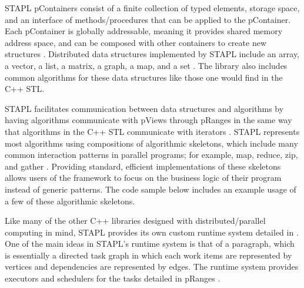 {STAPL pContainers consist of a finite collection of typed elements, storage space, and an interface of methods/procedures that can be applied to the pContainer. \cite{stapl_parallel_container} Each pContainer is globally addressable, meaning it provides shared memory address space, and can be composed with other containers to create new structures \cite{stapl_parallel_container}. Distributed data structures implemented by STAPL include an array, a vector, a list, a matrix, a graph, a map, and a set \cite{stapl_parray} \cite{stapl_graph}. The library also includes common algorithms for these data structures like those one would find in the C++ STL. 

STAPL facilitates communication between data structures and algorithms by having algorithms communicate with pViews through pRanges in the same way that algorithms in the C++ STL communicate with iterators \cite{stapl_parallel_container}. STAPL represents most algorithms using compositions of algorithmic skeletons, which include many common interaction patterns in parallel programs; for example, map, reduce, zip, and gather \cite{stapl_skeleton_framework}. Providing standard, efficient implementations of these skeletons allows users of the framework to focus on the business logic of their program instead of generic patterns. The code sample below includes an example usage of a few of these algorithmic skeletons. 

Like many of the other C++ libraries designed with distributed/parallel computing in mind, STAPL provides its own custom runtime system detailed in \cite{stapl_rts}. One of the main ideas in STAPL's runtime system is that of a paragraph, which is essentially a directed task graph in which each work items are represented by vertices and dependencies are represented by edges. The runtime system provides executors and schedulers for the tasks detailed in pRanges \cite{STAPL_2010}.
}

